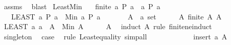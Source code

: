 \begin{isabellebody}
\ assms{\isacharparenleft}{\kern0pt}{}{\isacharparenright}{\kern0pt}\ \isamarkupfalse%
\ blast\isanewline
{}\isamarkupfalse%
%
\endisatagproof
{\isafoldproof}%
%
\isadelimproof
\isanewline
%
\endisadelimproof
\isanewline
{}\isamarkupfalse%
\ Least{\isacharunderscore}{\kern0pt}Min{\isacharcolon}{\kern0pt}\isanewline
\ \ \ {\isachardoublequoteopen}finite\ {\isacharbraceleft}{\kern0pt}a{\isachardot}{\kern0pt}\ P\ a{\isacharbraceright}{\kern0pt}{\isachardoublequoteclose}\ \ {\isachardoublequoteopen}{\isasymexists}a{\isachardot}{\kern0pt}\ P\ a{\isachardoublequoteclose}\isanewline
\ \ \ {\isachardoublequoteopen}{\isacharparenleft}{\kern0pt}LEAST\ a{\isachardot}{\kern0pt}\ P\ a{\isacharparenright}{\kern0pt}\ {\isacharequal}{\kern0pt}\ Min\ {\isacharbraceleft}{\kern0pt}a{\isachardot}{\kern0pt}\ P\ a{\isacharbraceright}{\kern0pt}{\isachardoublequoteclose}\isanewline
%
\isadelimproof
%
\endisadelimproof
%
\isatagproof
{}\isamarkupfalse%
\ {\isacharminus}{\kern0pt}\isanewline
\ \ \isacommand{{\isacharbraceleft}{\kern0pt}}\isamarkupfalse%
\ \isamarkupfalse%
\ A\ {\isacharcolon}{\kern0pt}{\isacharcolon}{\kern0pt}\ {\isachardoublequoteopen}{\isacharprime}{\kern0pt}a\ set{\isachardoublequoteclose}\isanewline
\ \ \ \ \isamarkupfalse%
\ A{\isacharcolon}{\kern0pt}\ {\isachardoublequoteopen}finite\ A{\isachardoublequoteclose}\ {\isachardoublequoteopen}A\ {\isasymnoteq}\ {\isacharbraceleft}{\kern0pt}{\isacharbraceright}{\kern0pt}{\isachardoublequoteclose}\isanewline
\ \ \ \ \isamarkupfalse%
\ {\isachardoublequoteopen}{\isacharparenleft}{\kern0pt}LEAST\ a{\isachardot}{\kern0pt}\ a\ {\isasymin}\ A{\isacharparenright}{\kern0pt}\ {\isacharequal}{\kern0pt}\ Min\ A{\isachardoublequoteclose}\isanewline
\ \ \ \ \isamarkupfalse%
\ A\ \isamarkupfalse%
\ {\isacharparenleft}{\kern0pt}induct\ A\ rule{\isacharcolon}{\kern0pt}\ finite{\isacharunderscore}{\kern0pt}ne{\isacharunderscore}{\kern0pt}induct{\isacharparenright}{\kern0pt}\isanewline
\ \ \ \ \ \ \isamarkupfalse%
\ singleton\ \isamarkupfalse%
\ {\isacharquery}{\kern0pt}case\ \isamarkupfalse%
\ {\isacharparenleft}{\kern0pt}rule\ Least{\isacharunderscore}{\kern0pt}equality{\isacharparenright}{\kern0pt}\ simp{\isacharunderscore}{\kern0pt}all\isanewline
\ \ \ \ \isamarkupfalse%
\isanewline
\ \ \ \ \ \ \isamarkupfalse%
\ {\isacharparenleft}{\kern0pt}insert\ a\ A{\isacharparenright}{\kern0pt}\isanewline

\end{isabellebody}
